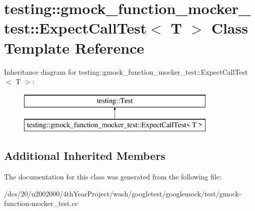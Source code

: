 \hypertarget{classtesting_1_1gmock__function__mocker__test_1_1ExpectCallTest}{}\section{testing\+:\+:gmock\+\_\+function\+\_\+mocker\+\_\+test\+:\+:Expect\+Call\+Test$<$ T $>$ Class Template Reference}
\label{classtesting_1_1gmock__function__mocker__test_1_1ExpectCallTest}
Inheritance diagram for testing\+:\+:gmock\+\_\+function\+\_\+mocker\+\_\+test\+:\+:Expect\+Call\+Test$<$ T $>$\+:\begin{figure}[H]
\begin{center}
\leavevmode
\includegraphics[height=2.000000cm]{classtesting_1_1gmock__function__mocker__test_1_1ExpectCallTest}
\end{center}
\end{figure}
\subsection*{Additional Inherited Members}


The documentation for this class was generated from the following file\+:\begin{DoxyCompactItemize}
\item 
/dcs/20/u2002000/4th\+Year\+Project/wash/googletest/googlemock/test/gmock-\/function-\/mocker\+\_\+test.\+cc\end{DoxyCompactItemize}
